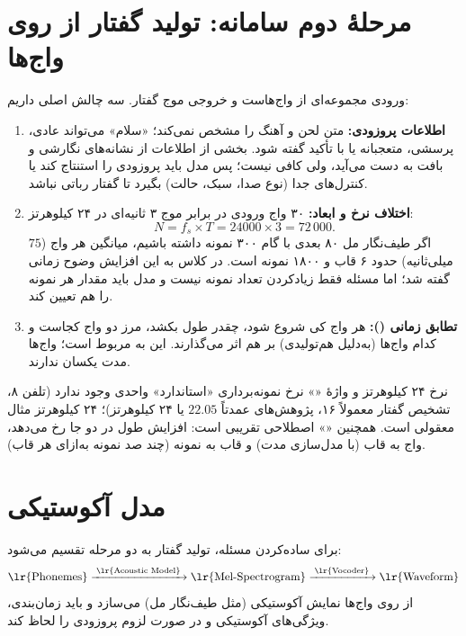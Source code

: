 \section{مرحلهٔ دوم سامانه: تولید گفتار از روی واج‌ها}

ورودی مجموعه‌ای از واج‌هاست و خروجی موج گفتار. سه چالش اصلی داریم:
\begin{enumerate}
  \item \textbf{اطلاعات پروزودی:} متن لحن و آهنگ را مشخص نمی‌کند؛ «سلام» می‌تواند عادی، پرسشی، متعجبانه یا با تأکید گفته شود. بخشی از اطلاعات از نشانه‌های نگارشی و بافت به دست می‌آید، ولی کافی نیست؛ پس مدل باید پروزودی را استنتاج کند یا کنترل‌های جدا (نوع صدا، سبک، حالت) بگیرد تا گفتار رباتی نباشد.
  \item \textbf{اختلاف نرخ و ابعاد:} ۳۰ واج ورودی در برابر موج ۳ ثانیه‌ای در ۲۴ کیلوهرتز:
  \[
  N = f_s \times T = 24000 \times 3 = 72\,000 .
  \]
  اگر طیف‌نگار مل ۸۰ بعدی با گام ۳۰۰ نمونه داشته باشیم، میانگین هر واج ($75$ میلی‌ثانیه) حدود ۶ قاب و ۱۸۰۰ نمونه است. در کلاس به این افزایش وضوح زمانی  گفته شد؛ اما مسئله فقط زیادکردن تعداد نمونه نیست و مدل باید مقدار هر نمونه را هم تعیین کند.
  \item \textbf{تطابق زمانی ():} هر واج کی شروع شود، چقدر طول بکشد، مرز دو واج کجاست و کدام واج‌ها (به‌دلیل هم‌تولیدی) بر هم اثر می‌گذارند. این به  مربوط است؛ واج‌ها مدت یکسان ندارند.
\end{enumerate}

\begin{correctionbox}{نرخ ۲۴ کیلوهرتز و واژهٔ «»}
نرخ نمونه‌برداری «استاندارد» واحدی وجود ندارد (تلفن ۸، تشخیص گفتار معمولاً ۱۶، پژوهش‌های  عمدتاً $22.05$ یا ۲۴ کیلوهرتز)؛ ۲۴ کیلوهرتز مثال معقولی است. همچنین «» اصطلاحی تقریبی است: افزایش طول در دو جا رخ می‌دهد، واج به قاب (با مدل‌سازی مدت) و قاب به نمونه (چند صد نمونه به‌ازای هر قاب).
\end{correctionbox}

\section{مدل آکوستیکی}

برای ساده‌کردن مسئله، تولید گفتار به دو مرحله تقسیم می‌شود:
\[
\text{\lr{Phonemes}} \xrightarrow{\;\text{\lr{Acoustic Model}}\;} \text{\lr{Mel-Spectrogram}} \xrightarrow{\;\text{\lr{Vocoder}}\;} \text{\lr{Waveform}}
\]
 از روی واج‌ها نمایش آکوستیکی (مثل طیف‌نگار مل) می‌سازد و باید زمان‌بندی، ویژگی‌های آکوستیکی و در صورت لزوم پروزودی را لحاظ کند.

